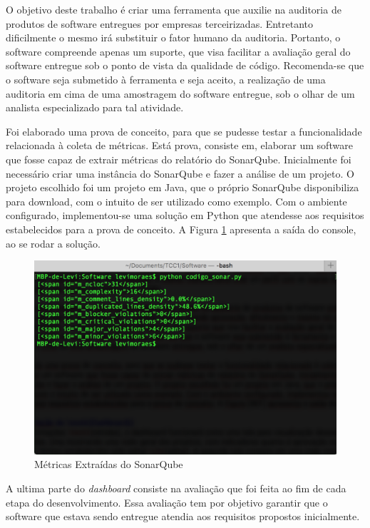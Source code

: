 O objetivo deste trabalho é criar uma ferramenta que auxilie na auditoria de produtos de software entregues por empresas terceirizadas. Entretanto dificilmente o mesmo irá substituir o fator humano da auditoria. Portanto, o software compreende apenas um suporte, que visa facilitar a avaliação geral do software entregue sob o ponto de vista da qualidade de código. Recomenda-se que o software seja submetido à ferramenta e seja aceito, a realização de uma auditoria em cima de uma amostragem do software entregue, sob o olhar de um analista especializado para tal atividade.

Foi elaborado uma prova de conceito, para que se pudesse testar a funcionalidade relacionada à coleta de métricas. Está prova, consiste em, elaborar um software que fosse capaz de extrair métricas do relatório do SonarQube. Inicialmente foi necessário criar uma instância do SonarQube e fazer a análise de um projeto. O projeto escolhido foi um projeto em Java, que o próprio SonarQube disponibiliza para download, com o intuito de ser utilizado como exemplo. Com o ambiente configurado, implementou-se uma solução em Python que atendesse aos requisitos estabelecidos para a prova de conceito. A Figura \ref{img:terminal} apresenta a saída do console, ao se rodar a solução.


\graphicspath{{figuras/}}
\begin{figure}[H]
\centering
\includegraphics[scale=0.60]{terminal.png}
\caption{Métricas Extraídas do SonarQube}
\label{img:terminal}
\end{figure}


A ultima parte do \textit{dashboard} consiste na avaliação que foi feita ao fim de cada etapa do desenvolvimento. Essa avaliação tem por objetivo garantir que o software que estava sendo entregue atendia aos requisitos propostos inicialmente. 


